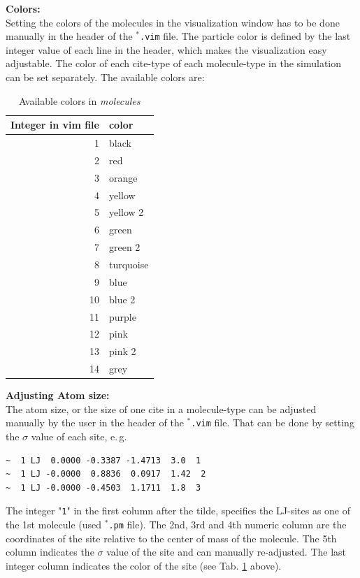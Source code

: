 \textbf{Colors:}\\
Setting the colors of the molecules in the visualization window has to be done manually in the header of the \texttt{$^{*}$\hspace{-3pt}.vim} file. The particle color is defined by the last integer value of each line in the header, which makes the visualization easy adjustable. The color of each cite-type of each molecule-type in the simulation can be set separately. The available colors are:

\begin{table}[htbp]
	\centering
	\caption{Available colors in \textit{molecules}}
	\begin{tabular}{rl}
		\toprule
		Integer in vim file & color \\
		\midrule
		1     & black \\
		2     & red \\
		3     & orange \\
		4     & yellow \\
		5     & yellow 2 \\
		6     & green \\
		7     & green 2 \\
		8     & turquoise \\
		9     & blue \\
		10    & blue 2 \\
		11    & purple \\
		12    & pink \\
		13    & pink 2 \\
		14    & grey \\
		\bottomrule
	\end{tabular}%
	\label{tab:Colours in vim file}%
\end{table}%




\textbf{Adjusting Atom size:}\\
The atom size, or the size of one cite in a molecule-type can be adjusted manually by the user in the header of the \texttt{$^{*}$\hspace{-3pt}.vim} file. That can be done by setting the $\sigma$ value of each site, e.\,g.
\begin{Verbatim}
~  1 LJ  0.0000 -0.3387 -1.4713  3.0  1
~  1 LJ -0.0000  0.8836  0.0917  1.42  2
~  1 LJ -0.0000 -0.4503  1.1711  1.8  3 
\end{Verbatim}
The integer "\texttt{1}" in the first column after the tilde, specifies the LJ-sites as one of the 1st molecule (used \texttt{$^{*}$\hspace{-3pt}.pm} file). The 2nd, 3rd and 4th numeric column are the coordinates of the site relative to the center of mass of the molecule. The 5th column indicates the $\sigma$ value of the site and can manually re-adjusted. The last integer column indicates the color of the site (see Tab. \ref{tab:Colours in vim file} above). 



